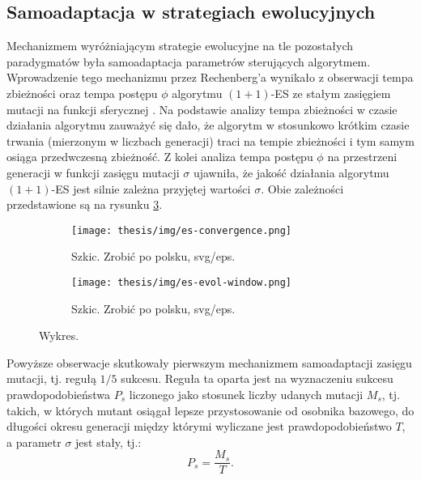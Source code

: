 \subsection{Samoadaptacja w strategiach ewolucyjnych}
\label{subsubsec:es-autoadapt}
    Mechanizmem wyróżniającym strategie ewolucyjne na tle pozostałych paradygmatów była samoadaptacja parametrów sterujących algorytmem. Wprowadzenie tego mechanizmu przez Rechenberg'a wynikało z obserwacji tempa zbieżności oraz tempa postępu $\phi$ algorytmu $(1+1)$-ES ze stałym zasięgiem mutacji na funkcji sferycznej \cite{Rechenberg:1973}. Na podstawie analizy tempa zbieżności w czasie działania algorytmu zauważyć się dało, że algorytm w stosunkowo krótkim czasie trwania (mierzonym w liczbach generacji) traci na tempie zbieżności i tym samym osiąga przedwczesną zbieżność. Z kolei analiza tempa postępu $\phi$ na przestrzeni generacji w funkcji zasięgu mutacji $\sigma$ ujawniła, że jakość działania algorytmu $(1+1)$-ES jest silnie zależna przyjętej wartości $\sigma$. Obie zależności przedstawione są na rysunku \ref{fig:conv-win}. \\
    \begin{figure}[h]
        \centering
            \begin{subfigure}
                \centering
                \texttt{[image: thesis/img/es-convergence.png]}
                \caption{Szkic. Zrobić po polsku, svg/eps.}
                \label{fig:es-convergence}
            \end{subfigure}
            \begin{subfigure}
                \centering
                \texttt{[image: thesis/img/es-evol-window.png]}
                \caption{Szkic. Zrobić po polsku, svg/eps.}
                \label{fig:es-evol-window}
            \end{subfigure}
        \caption{Wykres.}
        \label{fig:conv-win}
    \end{figure}
   \noindent Powyższe obserwacje skutkowały pierwszym mechanizmem samoadaptacji zasięgu mutacji, tj. regułą $1/5$ sukcesu. Reguła ta oparta jest na wyznaczeniu sukcesu prawdopodobieństwa $P_{s}$ liczonego jako stosunek liczby udanych mutacji $M_{s}$, tj. takich, w których mutant osiągał lepsze przystosowanie od osobnika bazowego, do długości okresu generacji między którymi wyliczane jest prawdopodobieństwo $T$, a parametr $\sigma$ jest stały, tj.:
    \begin{equation}
        P_{s} = \frac{M_{s}}{T}.
    \end{equation}
